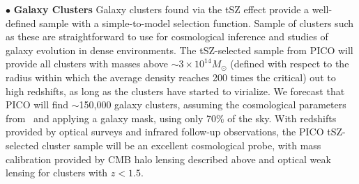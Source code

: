 \documentclass[PICOReport.tex]{subfiles}
\begin{document}
%
\noindent$\bullet$ {\bf Galaxy Clusters} \hspace{0.1in} \label{clusters}  Galaxy clusters found via the tSZ  effect provide a well-defined sample with a simple-to-model selection function. Sample of clusters such as these are straightforward to use for cosmological inference and studies of galaxy evolution in dense environments. The tSZ-selected sample from PICO will provide all clusters with masses above $\sim3\times10^{14} M_\odot$ (defined with respect to the radius within which the average density reaches 200 times the critical) out to high redshifts, 
as long as the clusters have started to virialize. We forecast that PICO will find $\sim$150,000 galaxy clusters, assuming the cosmological parameters from \planck\ and applying a galaxy mask, using only 70\% of the sky. With redshifts provided by optical surveys and infrared follow-up observations, the PICO tSZ-selected cluster sample will be an excellent cosmological probe, with mass calibration provided by CMB halo lensing described above and optical weak lensing for clusters with $z < 1.5$. 
\end{document}
